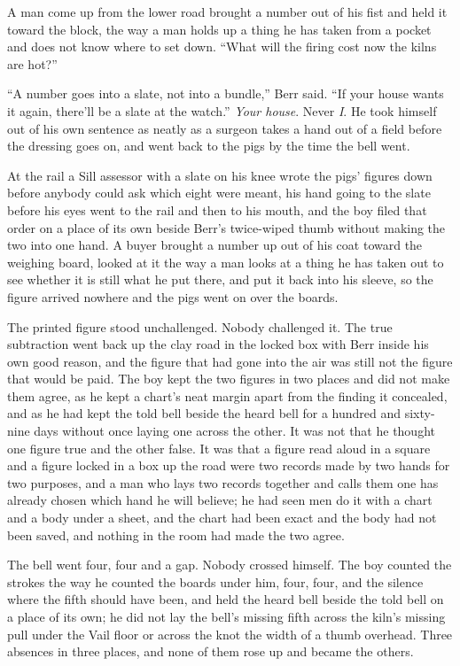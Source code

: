A man come up from the lower road brought a number out of his fist and held it toward the block, the way a man holds up a thing he has taken from a pocket and does not know where to set down. “What will the firing cost now the kilns are hot?”

“A number goes into a slate, not into a bundle,” Berr said. “If your house wants it again, there'll be a slate at the watch.” \emph{Your house}. Never \emph{I}. He took himself out of his own sentence as neatly as a surgeon takes a hand out of a field before the dressing goes on, and went back to the pigs by the time the bell went.

At the rail a Sill assessor with a slate on his knee wrote the pigs' figures down before anybody could ask which eight were meant, his hand going to the slate before his eyes went to the rail and then to his mouth, and the boy filed that order on a place of its own beside Berr's twice-wiped thumb without making the two into one hand. A buyer brought a number up out of his coat toward the weighing board, looked at it the way a man looks at a thing he has taken out to see whether it is still what he put there, and put it back into his sleeve, so the figure arrived nowhere and the pigs went on over the boards.

The printed figure stood unchallenged. Nobody challenged it. The true subtraction went back up the clay road in the locked box with Berr inside his own good reason, and the figure that had gone into the air was still not the figure that would be paid. The boy kept the two figures in two places and did not make them agree, as he kept a chart's neat margin apart from the finding it concealed, and as he had kept the told bell beside the heard bell for a hundred and sixty-nine days without once laying one across the other. It was not that he thought one figure true and the other false. It was that a figure read aloud in a square and a figure locked in a box up the road were two records made by two hands for two purposes, and a man who lays two records together and calls them one has already chosen which hand he will believe; he had seen men do it with a chart and a body under a sheet, and the chart had been exact and the body had not been saved, and nothing in the room had made the two agree.

The bell went four, four and a gap. Nobody crossed himself. The boy counted the strokes the way he counted the boards under him, four, four, and the silence where the fifth should have been, and held the heard bell beside the told bell on a place of its own; he did not lay the bell's missing fifth across the kiln's missing pull under the Vail floor or across the knot the width of a thumb overhead. Three absences in three places, and none of them rose up and became the others.


